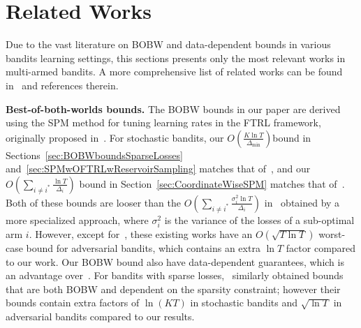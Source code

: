 
\newpage
\appendix


\section{Related Works}
\label{sec:RelatedWorks}
Due to the vast literature on BOBW and data-dependent bounds in various bandits learning settings, this sections presents only the most relevant works in multi-armed bandits.
A more comprehensive list of related works can be found in~\citet{ItoCOLT2024,Tsuchiya2023stabilitypenaltyadaptive} and references therein.

\textbf{Best-of-both-worlds bounds.} The BOBW bounds in our paper are derived using the SPM method for tuning learning rates in the FTRL framework, originally proposed in~\citet{ItoCOLT2024}. For stochastic bandits, our $O(\frac{K\ln{T}}{\Delta_{\min}})$bound  in Sections~\ref{sec:BOBWboundsSparseLosses} and~\ref{sec:SPMwOFTRLwReservoirSampling} matches that of~\citet{WeiAndLuo2018aBroadOMD,ItoCOLT2024}, and our $O(\sum_{i \neq i^*}\frac{\ln{T}}{\Delta_i})$ bound in Section~\ref{sec:CoordinateWiseSPM} matches that of~\citet{Zimmert2021TsallisINF, Ito2021HybridDataMABBound}. 
Both of these bounds are looser than the $O(\sum_{i \neq i^*}\frac{\sigma_i^2 \ln{T}}{\Delta_i})$ in~\citet{ItoCOLT2022aVariance} obtained by a more specialized approach, where $\sigma_i^2$ is the variance of the losses of a sub-optimal arm $i$.
However, except for~\citet{ItoCOLT2024}, these existing works have an $O(\sqrt{T\ln{T}})$ worst-case bound for adversarial bandits, which contains an extra $\ln{T}$ factor compared to our work. 
Our BOBW bound also have data-dependent guarantees, which is an advantage over~\citet{ItoCOLT2024}. 
For bandits with sparse losses,~\citet{Tsuchiya2023stabilitypenaltyadaptive} similarly obtained bounds that are both BOBW and dependent on the sparsity constraint; however their bounds contain extra factors of $\ln(KT)$ in stochastic bandits and $\sqrt{\ln{T}}$ in adversarial bandits compared to our results.

